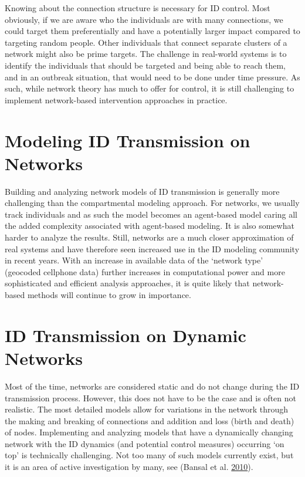 \documentclass[]{book}
\theoremstyle{definition}
\theoremstyle{definition}
\theoremstyle{definition}
\theoremstyle{remark}
\begin{document}
Knowing about the connection structure is necessary for ID control. Most
obviously, if we are aware who the individuals are with many
connections, we could target them preferentially and have a potentially
larger impact compared to targeting random people. Other individuals
that connect separate clusters of a network might also be prime targets.
The challenge in real-world systems is to identify the individuals that
should be targeted and being able to reach them, and in an outbreak
situation, that would need to be done under time pressure. As such,
while network theory has much to offer for control, it is still
challenging to implement network-based intervention approaches in
practice.

\section{Modeling ID Transmission on
Networks}\label{modeling-id-transmission-on-networks}

Building and analyzing network models of ID transmission is generally
more challenging than the compartmental modeling approach. For networks,
we usually track individuals and as such the model becomes an
agent-based model caring all the added complexity associated with
agent-based modeling. It is also somewhat harder to analyze the results.
Still, networks are a much closer approximation of real systems and have
therefore seen increased use in the ID modeling community in recent
years. With an increase in available data of the `network type'
(geocoded cellphone data) further increases in computational power and
more sophisticated and efficient analysis approaches, it is quite likely
that network-based methods will continue to grow in importance.

\section{ID Transmission on Dynamic
Networks}\label{id-transmission-on-dynamic-networks}

Most of the time, networks are considered static and do not change
during the ID transmission process. However, this does not have to be
the case and is often not realistic. The most detailed models allow for
variations in the network through the making and breaking of connections
and addition and loss (birth and death) of nodes. Implementing and
analyzing models that have a dynamically changing network with the ID
dynamics (and potential control measures) occurring `on top' is
technically challenging. Not too many of such models currently exist,
but it is an area of active investigation by many, see (Bansal et al.
\protect\hyperlink{ref-bansal10}{2010}).
\end{document}
